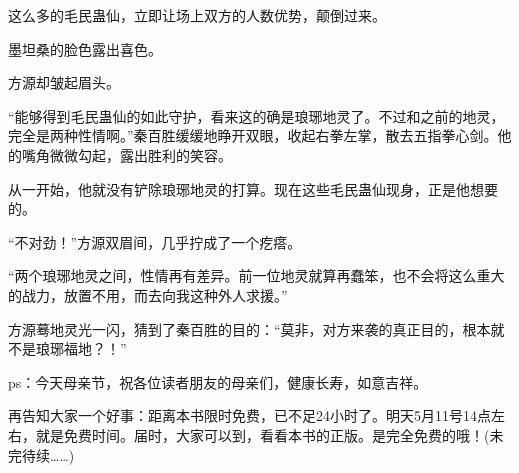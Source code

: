 \begin{this_body}
这么多的毛民蛊仙，立即让场上双方的人数优势，颠倒过来。

墨坦桑的脸色露出喜色。

方源却皱起眉头。

“能够得到毛民蛊仙的如此守护，看来这的确是琅琊地灵了。不过和之前的地灵，完全是两种性情啊。”秦百胜缓缓地睁开双眼，收起右拳左掌，散去五指拳心剑。他的嘴角微微勾起，露出胜利的笑容。

从一开始，他就没有铲除琅琊地灵的打算。现在这些毛民蛊仙现身，正是他想要的。

“不对劲！”方源双眉间，几乎拧成了一个疙瘩。

“两个琅琊地灵之间，性情再有差异。前一位地灵就算再蠢笨，也不会将这么重大的战力，放置不用，而去向我这种外人求援。”

方源蓦地灵光一闪，猜到了秦百胜的目的：“莫非，对方来袭的真正目的，根本就不是琅琊福地？！”

ps：今天母亲节，祝各位读者朋友的母亲们，健康长寿，如意吉祥。

再告知大家一个好事：距离本书限时免费，已不足24小时了。明天5月11号14点左右，就是免费时间。届时，大家可以到，看看本书的正版。是完全免费的哦！(未完待续……)

\end{this_body}

